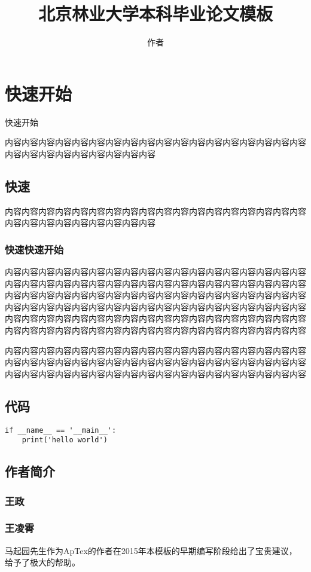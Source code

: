 \documentclass{bjfu}
\title{北京林业大学本科毕业论文模板}
\author{作者}
\begin{document}
\makeBjfuTitlePage
\section{快速开始}
快速开始 \cite{刘海洋2013LATEX}

内容内容内容内容内容内容内容内容内容内容内容内容内容内容内容内容内容内容内容内容内容内容内容内容内容内容内容

\subsection{快速}

内容内容内容内容内容内容内容内容内容内容内容内容内容内容内容内容内容内容内容内容内容内容内容内容内容内容内容

\subsubsection{快速快速开始}

内容内容内容内容内容内容内容内容内容内容内容内容内容内容内容内容内容内容内容内容内容内容内容内容内容内容内容内容内容内容内容内容内容内容内容内容内容内容内容内容内容内容内容内容内容内容内容内容内容内容内容内容内容内容内容内容内容内容内容内容内容内容内容内容内容内容内容内容内容内容内容内容内容内容内容内容内容内容内容内容内容内容内容内容内容内容内容内容内容内容内容内容内容内容内容内容内容内容内容内容内容内容内容内容内容内容内容内容

内容内容内容内容内容内容内容内容内容内容内容内容内容内容内容内容内容内容内容内容内容内容内容内容内容内容内容内容内容内容内容内容内容内容内容内容内容内容内容内容内容内容内容内容内容内容内容内容内容内容内容内容内容内容

\subsection{代码}

\begin{verbatim}
if __name__ == '__main__':
    print('hello world')
\end{verbatim}

\bjfuack

\subsection{作者简介}
\subsubsection{王政}

\subsubsection{王凌霄}

马起园先生作为ApTex的作者在2015年本模板的早期编写阶段给出了宝贵建议， 给予了极大的帮助。


\end{document}
